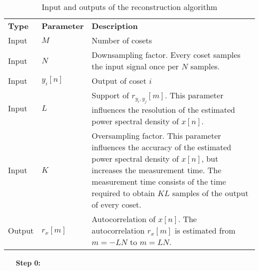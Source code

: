 \documentclass[a4paper, openany, oneside]{memoir}
\begin{document}
\begin{table}
    \centering
    \begin{tabularx}{\textwidth}{llY}
        \textbf{Type} & \textbf{Parameter} & \textbf{Description} \\
        Input & $M$ & Number of cosets \\
        Input & $N$ & Downsampling factor. Every coset samples the input signal once per $N$ samples. \\
        Input & $y_i[n]$ & Output of coset $i$ \\
        Input & $L$ & Support of $r_{y_i,y_j}[m]$. This parameter influences the resolution of the estimated power spectral density of $x[n]$. \\
        Input & $K$ & Oversampling factor. This parameter influences the accuracy of the estimated power spectral density of $x[n]$, but increases the measurement time. The measurement time consists of the time required to obtain $KL$ samples of the output of every coset. \\
        Output & $r_x[m]$ & Autocorrelation of $x[n]$. The autocorrelation $r_x[m]$ is estimated from $m=-LN$ to $m=LN$.
    \end{tabularx}
    \caption{Input and outputs of the reconstruction algorithm}
    \label{tab:reconstruction-algorithm-inputs-outputs}
\end{table}

\begin{enumerate}
    \item[\textbf{Step 0:}]
\end{enumerate}








\end{document}
